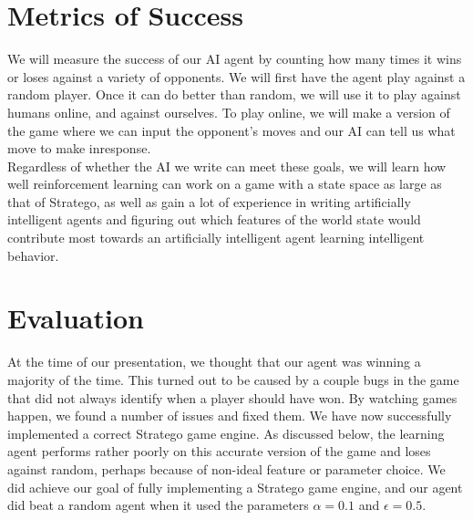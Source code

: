 \documentclass[letterpaper]{article}
\begin{document}
%

\section{Metrics of Success}
We will measure the success of our AI agent by counting how many times it wins or loses against a variety of opponents. We will first have the agent play against a random player. Once it can do better than random, we will use it to play against humans online, and against ourselves.  To play online, we will make a version of the game where we can input the opponent's moves and our AI can tell us what move to make inresponse.\\

Regardless of whether the AI we write can meet these goals, we will learn how well reinforcement learning can work on a game with a state space as large as that of Stratego, as well as gain a lot of experience in writing artificially intelligent agents and figuring out which features of the world state would contribute most towards an artificially intelligent agent learning intelligent behavior.
\\

\section{Evaluation}
At the time of our presentation, we thought that our agent was winning a majority of the time. This turned out to be caused
by a couple bugs in the game that did not always identify when a player should have won. 
By watching games happen, we found a number of 
issues and fixed them. We have now successfully implemented a correct Stratego game engine. 
As discussed below, the learning 
agent performs rather poorly on this accurate version of the game and loses against random, perhaps because of non-ideal
feature or parameter choice. We did achieve our goal of fully implementing a Stratego game engine, and our agent did beat
a random agent when it used the parameters $\alpha =0.1$ and $\epsilon = 0.5$.
\end{document}
